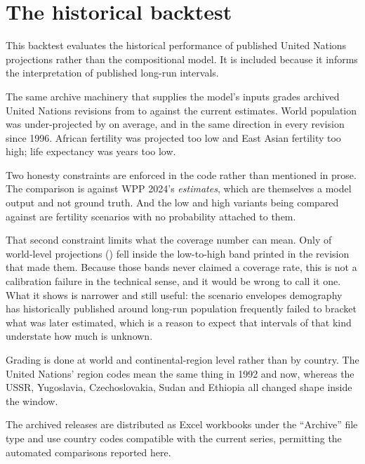 \section{The historical backtest}
\label{app:backtest}

This backtest evaluates the historical performance of published United Nations
projections rather than the compositional model. It is included because it
informs the interpretation of published long-run intervals.

The same archive machinery that supplies the model's inputs grades
\BacktestVintages{} archived United Nations revisions from
\BacktestFirstVintage{} to \BacktestLastVintage{} against the current estimates.
World population was under-projected by \BacktestWorldBias{} on average, and in
the same direction in every revision since 1996. African fertility was projected
\BacktestAfricaFertility{} too low and East Asian fertility
\BacktestEastAsiaFertility{} too high; life expectancy was
\BacktestLifeExpectancy{} years too low.

Two honesty constraints are enforced in the code rather than mentioned in prose.
The comparison is against WPP 2024's \emph{estimates}, which are themselves a
model output and not ground truth. And the low and high variants being compared
against are fertility scenarios with no probability attached to them.

That second constraint limits what the coverage number can mean. Only
\BacktestInsideRange{} of \BacktestRangeTotal{} world-level projections
(\BacktestRangeShare{}) fell inside the low-to-high band printed in the revision
that made them. Because those bands never claimed a coverage rate, this is not a
calibration failure in the technical sense, and it would be wrong to call it one.
What it shows is narrower and still useful: the scenario envelopes demography has
historically published around long-run population frequently failed to bracket
what was later estimated, which is a reason to expect that intervals of that kind
understate how much is unknown.

Grading is done at world and continental-region level rather than by country. The
United Nations' region codes mean the same thing in 1992 and now, whereas the
USSR, Yugoslavia, Czechoslovakia, Sudan and Ethiopia all changed shape inside the
window.

The archived releases are distributed as Excel workbooks under the ``Archive''
file type and use country codes compatible with the current series, permitting
the automated comparisons reported here.
